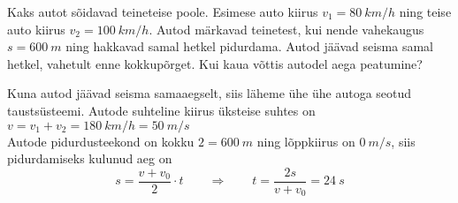 \setAuthor{}

Kaks autot sõidavad teineteise poole. Esimese auto kiirus $v_1=\SI{80}{km/h}$ ning teise auto kiirus $v_2 = \SI{100}{km/h}$. Autod märkavad teinetest, kui nende vahekaugus $s=\SI{600}{m}$ ning hakkavad samal hetkel pidurdama. Autod jäävad seisma samal hetkel, vahetult enne kokkupõrget. Kui kaua võttis autodel aega peatumine? 

\hint

\solu
Kuna autod jäävad seisma samaaegselt, siis läheme ühe ühe autoga seotud taustsüsteemi.
Autode suhteline kiirus üksteise suhtes on $v = v_1+v_2 = \SI{180}{km/h}=\SI{50}{m/s}$\\
Autode pidurdusteekond on kokku $2=\SI{600}{m}$ ning lõppkiirus on $\SI{0}{m/s}$, siis pidurdamiseks kulunud aeg on
\[ s = \frac{v + v_0}{2}\cdot t \quad\quad\Rightarrow\quad\quad t = \frac{2s}{v+v_0} = \SI{24}{s} \]
\probend